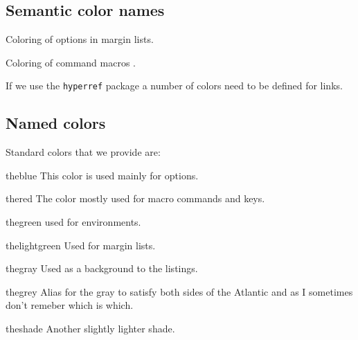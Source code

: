 
\subsection{Semantic color names}
\begin{marglist}
\item [\option{theoption}] Coloring of options in margin lists.
\item [\option{themacro}] Coloring of command macros .
\item [\option{hyperlink}] If we use the \texttt{hyperref} package a number of colors need to be defined for links.
\end{marglist}

\subsection{Named colors}
Standard colors that we provide are:
\begin{marglist}
\item [\textcolor{theblue}{theblue}] This color is used mainly for options.
\item [\textcolor{thered}{thered}] The color mostly used for macro commands and keys.
\item [\textcolor{thegreen}{thegreen}] used for environments.
\item [\textcolor{thelightgreen}{thelightgreen}] Used for margin lists.
\item [\textcolor{thegray}{thegray}] Used as a background to the listings.
\item [\colorbox{thegrey}{\color{white}thegrey}] Alias for the gray to satisfy both sides of the Atlantic and as I sometimes don't remeber which is which.
\item [\colorbox{theshade}{theshade}] Another slightly lighter shade.
\end{marglist}



